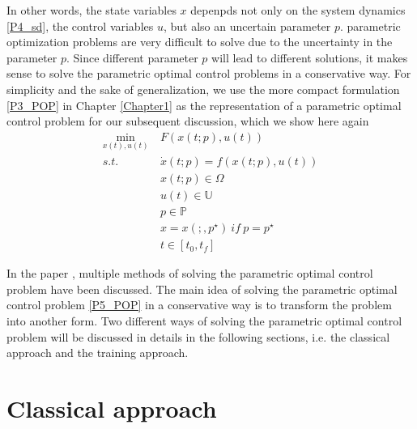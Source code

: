 \documentclass  [
  paper    = a4,
  BCOR     = 10mm,
  twoside,
  fontsize = 12pt,
  fleqn,
  toc      = bibnumbered,
  toc      = listofnumbered,
  numbers  = noendperiod,
  headings = normal,
  listof   = leveldown,
  version  = 3.03
]                                       {scrreprt}
\newcommand{\<}{\langle}
\renewcommand{\>}{\rangle}
\begin{document}
In other words, the state variables $x$ depenpds not only on the system dynamics \ref{P4_sd}, the control variables $u$, but also an uncertain parameter $p$. parametric optimization problems are very difficult to solve due to the uncertainty in the parameter $p$. Since different parameter $p$ will lead to different solutions, it makes sense to solve the parametric optimal control problems in a conservative way. For simplicity and the sake of generalization, we use the more compact formulation \ref{P3_POP} in  Chapter \ref{Chapter1} as the representation of a parametric optimal control problem for our subsequent discussion, which we show  here again
      \begin{equation}
	\begin{aligned}
	\underset{x(t), u(t)}{\text{min}}  \ &  F(x(t;p), u(t)) \\
	s.t.\ \  &  \dot{x} (t;p) = f(x(t;p), u(t))\\ 
	& x(t;p) \in \Omega \\
	& u(t) \in \mathbb{U}  \\
	& p  \in   \mathbb{P}  \\
	& x = x(;,p^\star) \ if \ p = p^\star \\
	& t \in [t_0, t_f]
\end{aligned}
	\label{P5_POP}
\end{equation}

 In the paper \cite{MatSch22}, multiple methods of solving the parametric optimal control problem have been discussed. The main idea of solving the parametric optimal control problem \ref{P5_POP}  in a conservative way is to transform the problem into another form. Two different ways of solving the parametric optimal control problem will be discussed in details in the following sections, i.e. the classical approach and the training approach. 



\section{Classical approach}
\label{Sec:CA}
\end{document}
